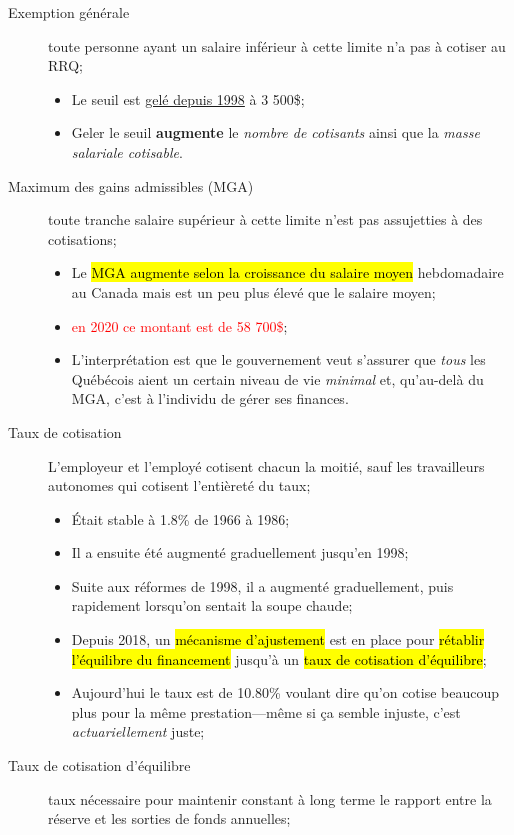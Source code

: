 \documentclass[10pt, french]{article}
\begin{document}
\begin{multicols*}{3}
\begin{description}
\begin{itemize}[leftmargin = *]
		\end{itemize}
	\item[Exemption générale]	toute personne ayant un salaire inférieur à cette limite n'a pas à cotiser au RRQ;
		\begin{itemize}[leftmargin = *]
			\item	Le seuil est \hyperlink{seuil_link}{\textcolor{blue_rectangle}{gelé depuis 1998}} à 3 500\$;
			\item	Geler le seuil \textbf{augmente} le \textit{nombre de cotisants} ainsi que la \textit{masse salariale cotisable}.
		\end{itemize}
	\item[Maximum des gains admissibles (MGA)] toute tranche salaire supérieur à cette limite n'est pas assujetties à des cotisations;
		\begin{itemize}[leftmargin = *]
			\item	Le \hl{MGA augmente selon la croissance du salaire moyen} hebdomadaire au Canada mais est un peu plus élevé que le salaire moyen;
			\item	\textcolor{red}{en 2020 ce montant est de 58 700\$};
			\item	L’interprétation est que le gouvernement veut s’assurer que \textit{tous} les Québécois aient un certain niveau de vie \textit{minimal} et, qu’au-delà du MGA, c’est à l’individu de gérer ses finances.
		\end{itemize}
	\item[Taux de cotisation]	L'employeur et l'employé cotisent chacun la moitié, sauf les travailleurs autonomes qui cotisent l'entièreté du taux;
		\begin{itemize}[leftmargin = *]
			\item	Était stable à 1.8\% de 1966 à 1986;
			\item	Il a ensuite été augmenté graduellement jusqu'en 1998;
			\item	Suite aux réformes de 1998, il a augmenté graduellement, puis rapidement lorsqu'on sentait la soupe chaude;
			\item	Depuis 2018, un \hl{mécanisme d'ajustement} est en place pour \hl{rétablir l'équilibre du financement} jusqu'à un \hl{taux de cotisation d'équilibre};
			\item	Aujourd'hui le taux est de 10.80\% voulant dire qu'on cotise beaucoup plus pour la même prestation---même si ça semble injuste, c'est \textit{actuariellement} juste;
		\end{itemize}
	\item[Taux de cotisation d'équilibre]	taux nécessaire pour maintenir constant à long terme le rapport entre la réserve et les sorties de fonds annuelles;

\end{description}
\end{multicols*}
\end{document}
